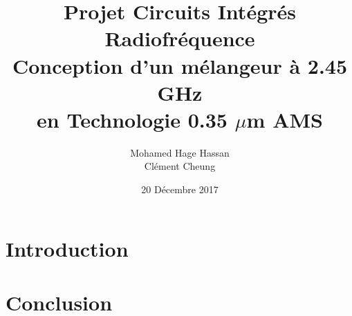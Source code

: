 \documentclass[a4paper]{article}
\begin{document}
\newcommand\textstyleEmphasis[1]{\textit{#1}}
\renewcommand{\contentsname}{Table des mati\`eres}
\renewcommand\refname{R\'ef\'erences}

\renewcommand{\abstractname}{Pr\'eambule}
\title{\textbf{Projet Circuits Int\'egr\'es Radiofr\'equence \\ Conception d'un m\'elangeur \`a 2.45 GHz \\ en Technologie 0.35 $\mu$m  AMS}}
\author{Mohamed Hage Hassan \\ Cl\'ement Cheung}
\date{20 D\'ecembre 2017}
\maketitle
\thispagestyle{empty}

\tableofcontents
\clearpage

\iffalse

\begin{figure}[!htb]
\begin{center}
  \texttt{[image: Echantillonneur-bloqueur.png]}
  \caption{Sch\'ema d'un \'echantilloneur-bloqueur \`a capacit\'e commut\'ee}
\end{center}
\end{figure}

\begin{figure}[!htb]
  \begin{subfigure}[t]{.5\linewidth}
      \centering
      \texttt{[image: circuit-RC.png]}
      \label{fig:rccircuit}
  \end{subfigure}%
  \begin{subfigure}[t]{.5\linewidth}
    \centering
    \texttt{[image: sim-inital.png]}
    \label{fig:rccircuit-sim}
  \end{subfigure}%
  \caption{Sch\'ema et Simulation du circuit}
  \label{fig:RC-sim}
\end{figure}

\fi

\section*{Introduction}


\clearpage
\section*{Conclusion}
\end{document}
